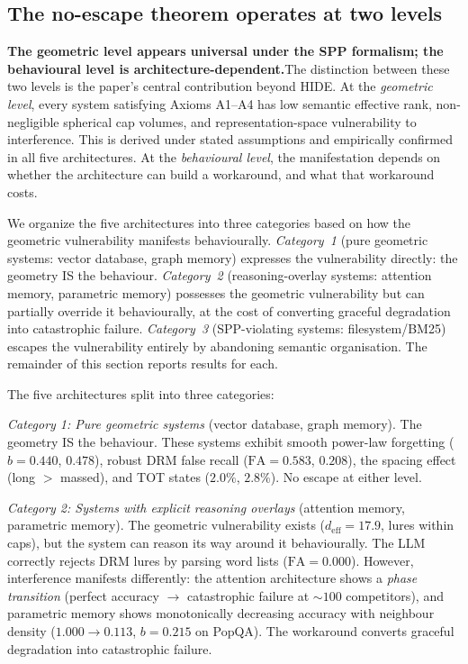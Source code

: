 \documentclass[11pt]{article}
\begin{document}
\subsection*{The no-escape theorem operates at two levels}

\noindent\textbf{The geometric level appears universal under the SPP formalism; the behavioural level is architecture-dependent.}\quad The distinction between these two levels is the paper's central contribution beyond HIDE. At the \textit{geometric level}, every system satisfying Axioms A1--A4 has low semantic effective rank, non-negligible spherical cap volumes, and representation-space vulnerability to interference. This is derived under stated assumptions and empirically confirmed in all five architectures. At the \textit{behavioural level}, the manifestation depends on whether the architecture can build a workaround, and what that workaround costs.

We organize the five architectures into three categories based on how the geometric vulnerability manifests behaviourally. \textit{Category~1} (pure geometric systems: vector database, graph memory) expresses the vulnerability directly: the geometry IS the behaviour. \textit{Category~2} (reasoning-overlay systems: attention memory, parametric memory) possesses the geometric vulnerability but can partially override it behaviourally, at the cost of converting graceful degradation into catastrophic failure. \textit{Category~3} (SPP-violating systems: filesystem/BM25) escapes the vulnerability entirely by abandoning semantic organisation. The remainder of this section reports results for each.

The five architectures split into three categories:

\textit{Category 1: Pure geometric systems} (vector database, graph memory). The geometry IS the behaviour. These systems exhibit smooth power-law forgetting ($b = 0.440$, $0.478$), robust DRM false recall ($\text{FA} = 0.583$, $0.208$), the spacing effect (long $>$ massed), and TOT states ($2.0\%$, $2.8\%$). No escape at either level.

\textit{Category 2: Systems with explicit reasoning overlays} (attention memory, parametric memory). The geometric vulnerability exists ($d_\text{eff} = 17.9$, lures within caps), but the system can reason its way around it behaviourally. The LLM correctly rejects DRM lures by parsing word lists ($\text{FA} = 0.000$). However, interference manifests differently: the attention architecture shows a \textit{phase transition} (perfect accuracy $\to$ catastrophic failure at $\sim 100$ competitors), and parametric memory shows monotonically decreasing accuracy with neighbour density ($1.000 \to 0.113$, $b = 0.215$ on PopQA). The workaround converts graceful degradation into catastrophic failure.
\end{document}

